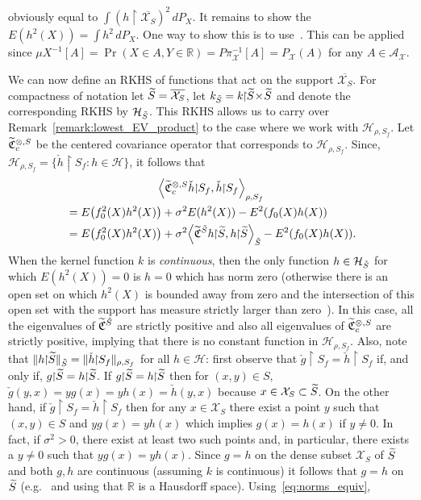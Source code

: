 \documentclass[AHL,Unicode,longabstracts,published]{cedram}
\theoremstyle{remark}
\newcommand{\restrr}
{\!\!\upharpoonright\!\!}
\newcommand{\R}{\mathbb{R}}
\newcommand{\X}{\mathcal{X}}
\newcommand{\clA}{\mathcal{A}}
\newcommand{\cH}{\mathcal{H}}
\newcommand{\fkC}{\mathfrak{C}}
\newcommand{\Cov}{\tilde{\fkC}}
\let\oldtilde\tilde
\renewcommand*{\tilde}[1]{\mathchoice{\widetilde{#1}}{\widetilde{#1}}{\oldtilde{#1}}{\oldtilde{#1}}}
\let\originalleft\left
\let\originalright\right
\renewcommand{\left}{\mathopen{}\mathclose\bgroup\originalleft}
\renewcommand{\right}{\aftergroup\egroup\originalright}
\begin{document}
obviously equal to $\int (h\!\restrr\! \overline{\X_S})^2 \, dP_X$. It remains to show the $E(h^2(X)) = \int h^2 \, dP_X$. One way to show this is to use~\cite[235E]{FREM}. This can be applied since $\mu X^{-1}[A] = \Pr(X \in A, Y\in \R) = P \pi_\X^{-1}[A] = P_\X(A) $ for any $A\in \clA_\X$.

We can now define an RKHS of functions that act on the support $\overline{\X_S}$. For compactness of notation let $\tilde S = \overline{\X_S}$, let $k_{\tilde S} = k\restrr\tilde S \! \times \! \tilde S$ and denote the corresponding RKHS by $\cH_{\tilde S}$. This RKHS allows us to carry over Remark~\ref{remark:lowest_EV_product} to the case where we work with $\cH_{\rho,S_f}$. Let $\Cov^{\otimes,S}_c$ be the centered covariance operator that corresponds to $\cH_{\rho,S_f}$. Since, $\cH_{\rho,S_f} = \{ \check h \restrr S_f : h \in \cH\}$, it follows that
\begin{multline} \label{eq:cov_lbd_hcheck}
\left\langle \Cov^{\otimes,S}_c \check h \restrr S_f, \check h \restrr S_f \right\rangle_{\rho,S_f}\\
\begin{aligned}
&= E\left(f^2_0(X) h^2(X)\right) + \sigma^2 E(h^2(X)) - E^2(f_0(X) h(X)) \\
&= E\left(f_0^2(X) h^2(X)\right) + \sigma^2 \left\langle \Cov^{\tilde S} h \restrr \tilde S, h \restrr \tilde S \right\rangle_{\tilde S} - E^2(f_0(X) h(X)).
\end{aligned}
\end{multline}
When the kernel function $k$ is \emph{continuous}, then the only function $h \in \cH_{\tilde S}$ for which $E(h^2(X)) = 0$ is $h = 0$ which has norm zero (otherwise there is an open set on which $h^2(X)$ is bounded away from zero and the intersection of this open set with the support has measure strictly larger than zero~\cite[411N]{FREM}). In this case, all the eigenvalues of $\Cov^{\tilde S}$ are strictly positive and also all eigenvalues of $\Cov^{\otimes,S}_c$ are strictly positive, implying that there is no constant function in $\cH_{\rho,S_f}$. Also, note that $\|h \restrr \tilde S \|_{\tilde S} = \| \check h \restrr S_f \|_{\rho,S_f}$ for all $h \in \cH$: first observe that $\check g \restrr S_f = \check h \restrr S_f$ if, and only if, $g \restrr \tilde S = h \restrr \tilde S$. If $g \restrr \tilde S = h \restrr \tilde S$ then for $(x,y) \in S$, $\check g (y,x) = y g(x) = y h(x) = \check h(y,x)$ because $x\in \X_S \subset \tilde S$. On the other hand, if $\check g \restrr S_f = \check h \restrr S_f$ then for any $x \in \X_S$ there exist a point $y$ such that $(x,y) \in S$ and $y g(x) = y h(x)$ which implies $g(x) = h(x)$ if $y \not = 0$. In fact, if $\sigma^2 >0$, there exist at least two such points and, in particular, there exists a $y \not = 0$ such that $y g(x) = y h(x)$. Since $g=h$ on the dense subset $\X_S$ of $\tilde S$ and both $g,h$ are continuous (assuming $k$ is continuous) it follows that $g = h$ on $\tilde S$ (e.g.~\cite[Theorem~1.5.4]{ENG89} and using that $\R$ is a Hausdorff space). Using~\eqref{eq:norms_equiv},
\end{document}
